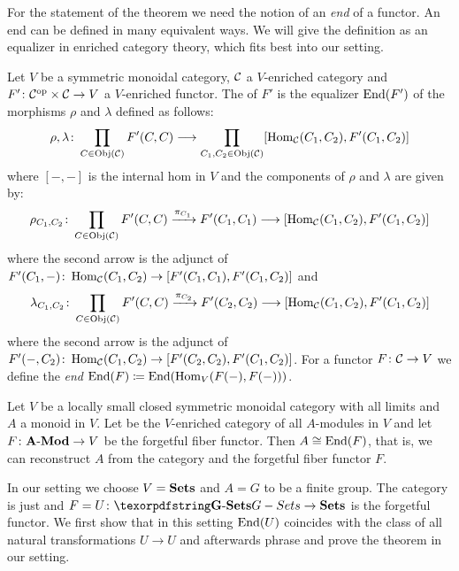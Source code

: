 For the statement of the theorem we need the notion of an \emph{end} of a functor. An end can be defined in many equivalent ways. We will give the definition as an equalizer in enriched category theory, which fits best into our setting.

\begin{defn}\label{defn:general_end}
Let $V$ be a symmetric monoidal category, $\mathcal{C}$ a $V$-enriched category and $F'\colon \mathcal{C}^{\operatorname{op}} \times \mathcal{C} \to V$ a $V$-enriched functor. The  of $F'$ is the equalizer $\operatorname{End}(F')$ of the morphisms $\rho$ and $\lambda$ defined as follows: \[\rho,\lambda\colon \prod_{C \in \operatorname{Obj}(\mathcal{C})} F'(C,C) \longrightarrow \prod_{C_1,C_2 \in \operatorname{Obj}(\mathcal{C})} [\operatorname{Hom}_{\mathcal{C}}(C_1,C_2),F'(C_1,C_2)]\] where $[-,-]$ is the internal hom in $V$ and the components of $\rho$ and $\lambda$ are given by: \[\rho_{C_1,C_2}\colon \prod_{C \in \operatorname{Obj}(\mathcal{C})} F'(C,C) \xrightarrow{\pi_{C_1}} F'(C_1,C_1) \longrightarrow [\operatorname{Hom}_{\mathcal{C}}(C_1,C_2),F'(C_1,C_2)]\] where the second arrow is the adjunct of $F'(C_1,-)\colon \operatorname{Hom}_{\mathcal{C}}(C_1,C_2) \to [F'(C_1,C_1),F'(C_1,C_2)]$ and \[\lambda_{C_1,C_2}\colon \prod_{C \in \operatorname{Obj}(\mathcal{C})} F'(C,C) \xrightarrow{\pi_{C_2}} F'(C_2,C_2) \longrightarrow [\operatorname{Hom}_{\mathcal{C}}(C_1,C_2),F'(C_1,C_2)]\] where the second arrow is the adjunct of $F'(-,C_2)\colon \operatorname{Hom}_{\mathcal{C}}(C_1,C_2) \to [F'(C_2,C_2),F'(C_1,C_2)]$. For a functor $F\colon \mathcal{C} \to V$ we define the \emph{end} $\operatorname{End}(F) \coloneqq \operatorname{End}(\operatorname{Hom}_V(F(-),F(-)))$.
\end{defn}

\begin{thm}\label{thm:general_tannaka}
Let $V$ be a locally small closed symmetric monoidal category with all limits and $A$ a monoid in $V$. Let \AMod{} be the $V$-enriched category of all $A$-modules in $V$ and let $F\colon {\ensuremath{\mathbf{A}{\operatorname{\mathbf{-Mod}}}}} \to V$ be the forgetful fiber functor. Then $A \cong \operatorname{End}(F)$, that is, we can reconstruct $A$ from the category \AMod{} and the forgetful fiber functor $F$.
\end{thm}

In our setting we choose $V = {{\operatorname{\mathbf{Sets}}}}$ and $A = G$ to be a finite group. The category \AMod{} is just \Gset{} and $F = U\colon \Gset \to \Set$ is the forgetful functor. We first show that in this setting $\operatorname{End}(U)$ coincides with the class of all natural transformations $U \to U$ and afterwards phrase and prove the theorem in our setting.

